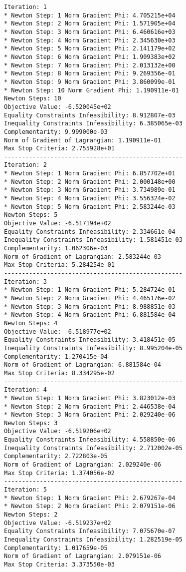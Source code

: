 \documentclass{article}
\begin{document}
\scriptsize
\begin{minipage}[t]{0.45\textwidth}
\begin{verbatim}
Iteration: 1
* Newton Step: 1 Norm Gradient Phi: 4.705215e+04
* Newton Step: 2 Norm Gradient Phi: 1.571905e+04
* Newton Step: 3 Norm Gradient Phi: 6.460616e+03
* Newton Step: 4 Norm Gradient Phi: 2.345630e+03
* Newton Step: 5 Norm Gradient Phi: 2.141179e+02
* Newton Step: 6 Norm Gradient Phi: 1.909383e+02
* Newton Step: 7 Norm Gradient Phi: 2.013132e+00
* Newton Step: 8 Norm Gradient Phi: 9.269356e-01
* Newton Step: 9 Norm Gradient Phi: 3.860099e-01
* Newton Step: 10 Norm Gradient Phi: 1.190911e-01
Newton Steps: 10
Objective Value: -6.520045e+02
Equality Constraints Infeasibility: 8.912807e-03
Inequality Constraints Infeasibility: 6.385065e-03
Complementarity: 9.999000e-03
Norm of Gradient of Lagrangian: 1.190911e-01
Max Stop Criteria: 2.755928e+01
--------------------------------------------------
Iteration: 2
* Newton Step: 1 Norm Gradient Phi: 6.857702e+01
* Newton Step: 2 Norm Gradient Phi: 2.000148e+00
* Newton Step: 3 Norm Gradient Phi: 3.734989e-01
* Newton Step: 4 Norm Gradient Phi: 3.556324e-02
* Newton Step: 5 Norm Gradient Phi: 2.583244e-03
Newton Steps: 5
Objective Value: -6.517194e+02
Equality Constraints Infeasibility: 2.334661e-04
Inequality Constraints Infeasibility: 1.581451e-03
Complementarity: 1.062306e-03
Norm of Gradient of Lagrangian: 2.583244e-03
Max Stop Criteria: 5.284254e-01
--------------------------------------------------
Iteration: 3
* Newton Step: 1 Norm Gradient Phi: 5.284724e-01
* Newton Step: 2 Norm Gradient Phi: 4.465176e-02
* Newton Step: 3 Norm Gradient Phi: 8.988851e-03
* Newton Step: 4 Norm Gradient Phi: 6.881584e-04
Newton Steps: 4
Objective Value: -6.518977e+02
Equality Constraints Infeasibility: 3.418451e-05
Inequality Constraints Infeasibility: 8.995204e-05
Complementarity: 1.270415e-04
Norm of Gradient of Lagrangian: 6.881584e-04
Max Stop Criteria: 8.334295e-02
--------------------------------------------------
Iteration: 4
* Newton Step: 1 Norm Gradient Phi: 3.823012e-03
* Newton Step: 2 Norm Gradient Phi: 2.446538e-04
* Newton Step: 3 Norm Gradient Phi: 2.029240e-06
Newton Steps: 3
Objective Value: -6.519206e+02
Equality Constraints Infeasibility: 4.558850e-06
Inequality Constraints Infeasibility: 2.712002e-05
Complementarity: 2.722803e-05
Norm of Gradient of Lagrangian: 2.029240e-06
Max Stop Criteria: 1.374056e-02
--------------------------------------------------
Iteration: 5
* Newton Step: 1 Norm Gradient Phi: 2.679267e-04
* Newton Step: 2 Norm Gradient Phi: 2.079151e-06
Newton Steps: 2
Objective Value: -6.519237e+02
Equality Constraints Infeasibility: 7.075670e-07
Inequality Constraints Infeasibility: 1.282519e-05
Complementarity: 1.017659e-05
Norm of Gradient of Lagrangian: 2.079151e-06
Max Stop Criteria: 3.373550e-03
\end{verbatim}
\end{minipage}
\end{document}
